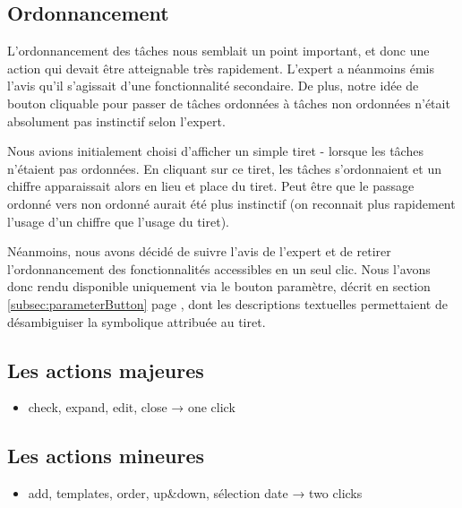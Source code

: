 \documentclass[11pt]{article}
\begin{document}


\subsection{Ordonnancement}

L'ordonnancement des tâches nous semblait un point important, et donc
une action qui devait être atteignable très rapidement. L'expert a
néanmoins émis l'avis qu'il s'agissait d'une fonctionnalité
secondaire. De plus, notre idée de bouton cliquable pour passer de
tâches ordonnées à tâches non ordonnées n'était absolument pas
instinctif selon l'expert.

Nous avions initialement choisi d'afficher un simple tiret - lorsque
les tâches n'étaient pas ordonnées. En cliquant sur ce tiret, les
tâches s'ordonnaient et un chiffre apparaissait alors en lieu et place
du tiret. Peut être que le passage ordonné vers non ordonné aurait été
plus instinctif (on reconnait plus rapidement l'usage d'un chiffre que
l'usage du tiret).

Néanmoins, nous avons décidé de suivre l'avis de l'expert et de
retirer l'ordonnancement des fonctionnalités accessibles en un seul
clic. Nous l'avons donc rendu disponible uniquement via le bouton
paramètre, décrit en section \ref{subsec:parameterButton} page
\pageref{subsec:parameterButton}, dont les descriptions textuelles
permettaient de désambiguiser la symbolique attribuée au tiret.



\subsection{Les actions majeures}
\begin{itemize}
\item check, expand, edit, close
  → one click
\end{itemize}


\subsection{Les actions mineures}
\begin{itemize}
\item add, templates, order, up\&down, sélection date
  → two clicks
\end{itemize}
\end{document}
